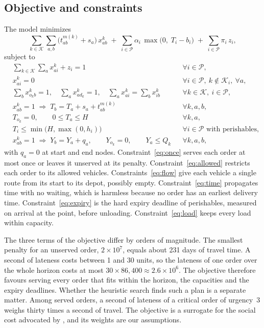 \documentclass[11pt]{article}
\begin{document}
\subsection{Objective and constraints}

The model minimizes
\begin{equation}\label{eq:obj}
\sum_{k\in\mathcal{K}}\sum_{a,b} \bigl(t^{m(k)}_{ab}+s_a\bigr)\,x^k_{ab}
\;+\;\sum_{i\in\mathcal{P}} \alpha_i \,\max\bigl(0,\;T_i-b_i\bigr)
\;+\;\sum_{i\in\mathcal{P}} \pi_i\, z_i ,
\end{equation}
subject to
\begin{align}
&\sum_{k\in\mathcal{K}}\sum_{a} x^k_{ai} + z_i = 1 && \forall i\in\mathcal{P}, \label{eq:once}\\
&x^k_{ai} = 0 && \forall i\in\mathcal{P},\ k\notin\mathcal{K}_i,\ \forall a, \label{eq:allowed}\\
&\textstyle\sum_{b} x^k_{o_k b} = 1,\quad \sum_{a} x^k_{a d_k} = 1,\quad \sum_a x^k_{ai}=\sum_b x^k_{ib} && \forall k\in\mathcal{K},\ i\in\mathcal{P}, \label{eq:flow}\\
&x^k_{ab}=1 \;\Rightarrow\; T_b = T_a + s_a + t^{m(k)}_{ab} && \forall k,a,b, \label{eq:time}\\
&T_{o_k}=0,\qquad 0\leq T_a\leq H && \forall k,a, \label{eq:horizon}\\
&T_i \leq \min\bigl(H,\max(0,h_i)\bigr) && \forall i\in\mathcal{P}\text{ with perishables}, \label{eq:expiry}\\
&x^k_{ab}=1 \;\Rightarrow\; Y_b = Y_a + q_a,\qquad Y_{o_k}=0,\qquad Y_a\leq Q_k && \forall k,a,b, \label{eq:load}
\end{align}
with $q_a=0$ at start and end nodes. Constraint~\eqref{eq:once} serves each order at most once or leaves it unserved at its penalty. Constraint~\eqref{eq:allowed} restricts each order to its allowed vehicles. Constraints~\eqref{eq:flow} give each vehicle a single route from its start to its depot, possibly empty. Constraint~\eqref{eq:time} propagates time with no waiting, which is harmless because no order has an earliest delivery time. Constraint~\eqref{eq:expiry} is the hard expiry deadline of perishables, measured on arrival at the point, before unloading. Constraint~\eqref{eq:load} keeps every load within capacity.

The three terms of the objective differ by orders of magnitude. The smallest penalty for an unserved order, $2\times10^{7}$, equals about 231 days of travel time. A second of lateness costs between 1 and 30 units, so the lateness of one order over the whole horizon costs at most $30\times 86{,}400\approx 2.6\times10^{6}$. The objective therefore favours serving every order that fits within the horizon, the capacities and the expiry deadlines. Whether the heuristic search finds such a plan is a separate matter. Among served orders, a second of lateness of a critical order of urgency~3 weighs thirty times a second of travel. The objective is a surrogate for the social cost advocated by \citet{holguinveras2013objective}, and its weights are our assumptions.
\end{document}
